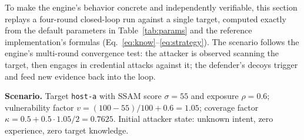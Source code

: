 \documentclass[11pt]{article}
\newcommand{\act}[1]{\texttt{#1}}
\begin{document}
To make the engine's behavior concrete and independently verifiable, this
section replays a four-round closed-loop run against a single target,
computed exactly from the default parameters in Table~\ref{tab:params} and
the reference implementation's formulas
(Eq.~\ref{eq:know}--\ref{eq:strategy}). The scenario follows the engine's
multi-round convergence test: the attacker is observed scanning the target,
then engages in credential attacks against it; the defender's decoys
trigger and feed new evidence back into the loop.

\textbf{Scenario.} Target \act{host-a} with SSAM score $\sigma = 55$ and
exposure $\rho = 0.6$; vulnerability factor $v = (100-55)/100 + 0.6 = 1.05$;
coverage factor $\kappa = 0.5 + 0.5 \cdot 1.05/2 = 0.7625$. Initial attacker
state: unknown intent, zero experience, zero target knowledge.
\end{document}
